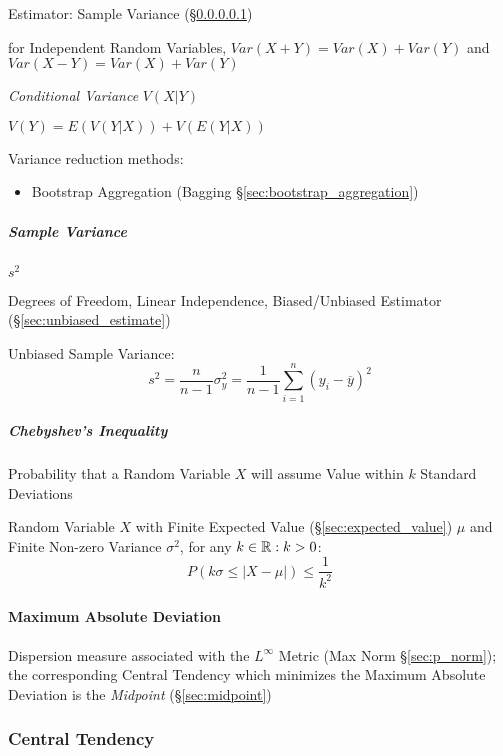 \fist Estimator: Sample Variance (\S\ref{sec:sample_variance})

for Independent Random Variables, $Var(X + Y) = Var(X) + Var(Y)$ and
$Var(X - Y) = Var(X) + Var(Y)$

\emph{Conditional Variance} $V(X|Y)$

$V(Y) = E(V(Y|X)) + V(E(Y|X))$

Variance reduction methods:
\begin{itemize}
  \item Bootstrap Aggregation (Bagging \S\ref{sec:bootstrap_aggregation})
\end{itemize}



\subparagraph{Sample Variance}\label{sec:sample_variance}\hfill

$s^2$

Degrees of Freedom, Linear Independence, Biased/Unbiased Estimator
(\S\ref{sec:unbiased_estimate})

Unbiased Sample Variance:
\[
  s^2 = \frac{n}{n-1}\sigma^2_y =
  \frac{1}{n-1} \sum_{i=1}^n (y_i - \overline{y})^2
\]



\subparagraph{Chebyshev's Inequality}\label{sec:chebyshevs_inequality}\hfill

Probability that a Random Variable $X$ will assume Value within $k$ Standard
Deviations

Random Variable $X$ with Finite Expected Value (\S\ref{sec:expected_value})
$\mu$ and Finite Non-zero Variance $\sigma^2$, for any $k \in \mathbb{R} : k > 0$:
\[
  P(k\sigma \leq |X - \mu|) \leq \frac{1}{k^2}
\]



\paragraph{Maximum Absolute Deviation}
\label{sec:maximum_absolute_deviation}\hfill

Dispersion measure associated with the $L^\infty$ Metric (Max Norm
\S\ref{sec:p_norm}); the corresponding Central Tendency which minimizes the
Maximum Absolute Deviation is the \emph{Midpoint} (\S\ref{sec:midpoint})



\subsubsection{Central Tendency}\label{sec:central_tendency}


